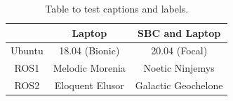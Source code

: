 %


\begin{table}[h!]
\centering
\begin{tabular}{c |c| c}
                &   Laptop              &   SBC and Laptop  \\
    \hline
    Ubuntu      &   18.04 (Bionic)      &   20.04 (Focal)   \\
    \hline
    ROS1        &   Melodic Morenia     &   Noetic Ninjemys \\  
    \hline
    ROS2        &   Eloquent Elusor     &   Galactic Geochelone\\
\end{tabular}
\caption{Table to test captions and labels.}
\label{table:1}
\end{table}